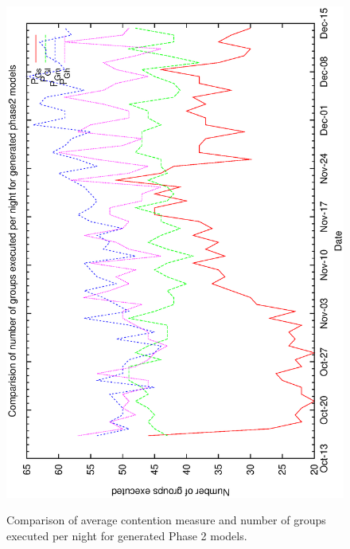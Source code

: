 \begin{figure}[h]
\begin{center}
{   \includegraphics[scale=0.5, angle=-90]{figures/c60_gen_ng.eps}  
   \label{fig:c60_gen_ng}
  }
  \caption[Comparison of average contention measure and number of groups executed per night for generated Phase 2 models]
{Comparison of average contention measure and number of groups executed per night for generated Phase 2 models.}
 \end{center}
\end{figure}

